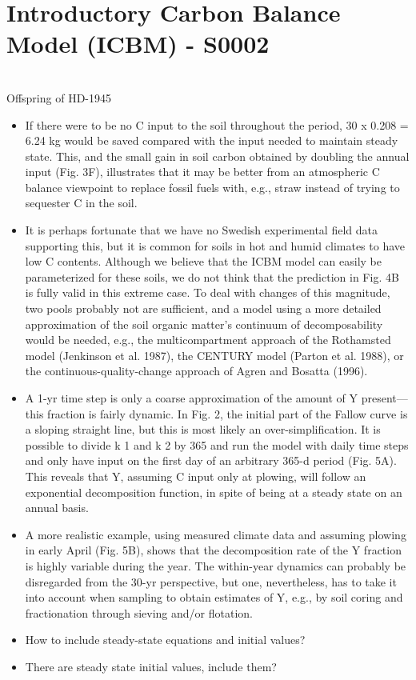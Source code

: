 \documentclass[american, 12pt]{article}
\newcommand{\red}[1]{{\color{red}#1}}
\begin{document}
\section{Introductory Carbon Balance Model (ICBM) - S0002}
\citep{Andren1997EcologicalApplications}\\
Offspring of HD-1945
\begin{itemize}
  \item If there were to be no C input to the soil throughout the period, 30 x 0.208 = 6.24 kg would be saved compared with the input needed to maintain steady state. This, and the small gain in soil carbon obtained by doubling the annual input (Fig. 3F), illustrates that it may be better from an atmospheric C balance viewpoint to replace fossil fuels with, e.g., straw instead of trying to sequester C in the soil.
  \item It is perhaps fortunate that we have no Swedish experimental field data supporting this, but it is common for soils in hot and humid climates to have low C contents. Although we believe that the ICBM model can easily be parameterized for these soils, we do not think that the prediction in Fig. 4B is fully valid in this extreme case. To deal with changes of this magnitude, two pools probably not are sufficient, and a model using a more detailed approximation of the soil organic matter’s continuum of decomposability would be needed, e.g., the multicompartment approach of the Rothamsted model (Jenkinson et al. 1987), the CENTURY model (Parton et al. 1988), or the continuous-quality-change approach of Agren and Bosatta (1996).
  \item A 1-yr time step is only a coarse approximation of the amount of Y present—this fraction is fairly dynamic. In Fig. 2, the initial part of the Fallow curve is a sloping straight line, but this is most likely an over-simplification. It is possible to divide k 1 and k 2 by 365 and run the model with daily time steps and only  have input on the first day of an arbitrary 365-d period (Fig. 5A). This reveals that Y, assuming C input only at plowing, will follow an exponential decomposition function, in spite of being at a steady state on an annual basis.
  \item A more realistic example, using measured climate data and assuming plowing in early April (Fig. 5B), shows that the decomposition rate of the Y fraction is highly variable during the year. The within-year dynamics can probably be disregarded from the 30-yr perspective, but one, nevertheless, has to take it into account when sampling to obtain estimates of Y, e.g., by soil coring and fractionation through sieving and/or flotation.
  \item \red{How to include steady-state equations and initial values?}
  \item \red{There are steady state initial values, include them?}
\end{itemize}
\end{document}
